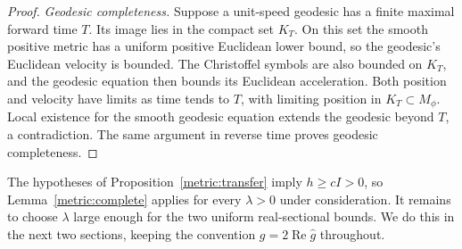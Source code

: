 \begin{proof}
\emph{Geodesic completeness.}
Suppose a unit-speed geodesic has a finite maximal forward time $T$.
Its image lies in the compact set $K_T$.  On this set the smooth
positive metric has a uniform positive Euclidean lower bound, so the
geodesic's Euclidean velocity is bounded.  The Christoffel symbols are
also bounded on $K_T$, and the geodesic equation then bounds its
Euclidean acceleration.  Both position and velocity have limits as
time tends to $T$, with limiting position in $K_T\subset M_\phi$.
Local existence for the smooth geodesic equation extends the geodesic
beyond $T$, a contradiction.  The same argument in reverse time proves
geodesic completeness.
\end{proof}

The hypotheses of Proposition~\ref{metric:transfer} imply $h\ge cI>0$,
so Lemma~\ref{metric:complete} applies for every $\lambda>0$ under
consideration.  It remains to choose $\lambda$ large enough for the two
uniform real-sectional bounds.  We do this in the next two sections,
keeping the convention $g=2\operatorname{Re}\widehat g$ throughout.
